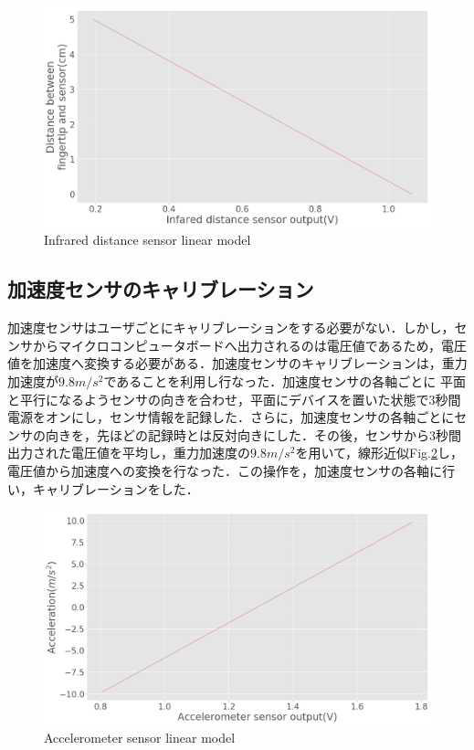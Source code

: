 \begin{figure}[H]
  \centering
  \includegraphics[width=0.8\linewidth]{fig/infrared_linearmodel}
  \caption{Infrared distance sensor linear model }
  \label{fig:cali_inf} 
\end{figure}

\subsection*{加速度センサのキャリブレーション}
加速度センサはユーザごとにキャリブレーションをする必要がない．しかし，センサからマイクロコンピュータボードへ出力されるのは電圧値であるため，電圧値を加速度へ変換する必要がある．加速度センサのキャリブレーションは，重力加速度が$9.8m/s^2$であることを利用し行なった．加速度センサの各軸ごとに
平面と平行になるようセンサの向きを合わせ，平面にデバイスを置いた状態で3秒間電源をオンにし，センサ情報を記録した．さらに，加速度センサの各軸ごとにセンサの向きを，先ほどの記録時とは反対向きにした．その後，センサから3秒間出力された電圧値を平均し，重力加速度の$9.8m/s^2$を用いて，線形近似Fig.\ref{fig:cali_accel}し，電圧値から加速度への変換を行なった．この操作を，加速度センサの各軸に行い，キャリブレーションをした．

\begin{figure}[H]
  \centering
  \includegraphics[width=0.8\linewidth]{fig/accel_linearmodel}
  \caption{Accelerometer sensor linear model }
  \label{fig:cali_accel}
\end{figure}


